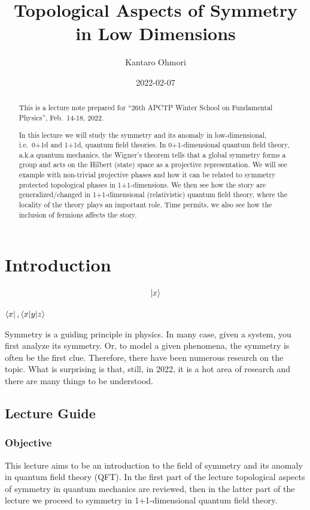 \documentclass[
]{scrartcl}
\title{Topological Aspects of Symmetry in Low Dimensions}
\author{Kantaro Ohmori}
\date{2022-02-07}
\begin{document}
\maketitle
\begin{abstract}
This is a lecture note prepared for ``26th APCTP Winter School on Fundamental Physics'', Feb.~14-18, 2022.

In this lecture we will study the symmetry and its anomaly in low-dimensional, i.e.~0+1d and 1+1d, quantum field theories.
In 0+1-dimensional quantum field theory, a.k.a quantum mechanics, the Wigner's theorem tells that a global symmetry forms a group and acts on the Hilbert (state) space as a projective representation. We will see example with non-trivial projective phases and how it can be related to symmetry protected topological phases in 1+1-dimensions. We then see how the story are generalized/changed in 1+1-dimensional (relativistic) quantum field theory, where the locality of the theory plays an important role.
Time permits, we also see how the inclusion of fermions affects the story.
\end{abstract}

{
\setcounter{tocdepth}{2}
\tableofcontents
}
\hypertarget{introduction}{%
\section{Introduction}\label{introduction}}

\[\ket{x}\]

\(\bra{x}, \braket{x|y|z}\)

Symmetry is a guiding principle in physics. In many case, given a system, you first analyze its symmetry. Or, to model a given phenomena, the symmetry is often be the first clue.
Therefore, there have been numerous research on the topic. What is surprising is that, still, in 2022, it is a hot area of research and there are many things to be understood.

\hypertarget{lecture-guide}{%
\subsection{Lecture Guide}\label{lecture-guide}}

\hypertarget{objective}{%
\subsubsection{Objective}\label{objective}}

This lecture aims to be an introduction to the field of symmetry and its anomaly in quantum field theory (QFT). In the first part of the lecture topological aspects of symmetry in quantum mechanics are reviewed, then in the latter part of the lecture we proceed to symmetry in 1+1-dimensional quantum field theory.
\end{document}
